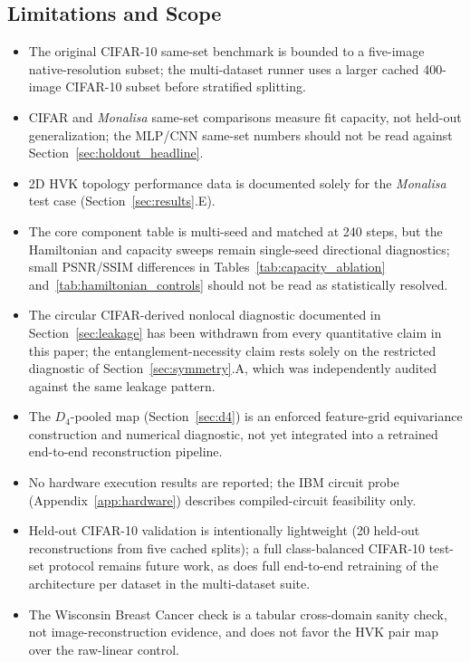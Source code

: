 \documentclass[journal]{IEEEtran}
\begin{document}
\subsection{Limitations and Scope}
\begin{itemize}
    \item The original CIFAR-10 same-set benchmark is bounded to a five-image native-resolution subset; the multi-dataset runner uses a larger cached 400-image CIFAR-10 subset before stratified splitting.
    \item CIFAR and \textit{Monalisa} same-set comparisons measure fit capacity, not held-out generalization; the MLP/CNN same-set numbers should not be read against Section~\ref{sec:holdout_headline}.
    \item 2D HVK topology performance data is documented solely for the \textit{Monalisa} test case (Section~\ref{sec:results}.E).
    \item The core component table is multi-seed and matched at 240 steps, but the Hamiltonian and capacity sweeps remain single-seed directional diagnostics; small PSNR/SSIM differences in Tables~\ref{tab:capacity_ablation} and~\ref{tab:hamiltonian_controls} should not be read as statistically resolved.
    \item The circular CIFAR-derived nonlocal diagnostic documented in Section~\ref{sec:leakage} has been withdrawn from every quantitative claim in this paper; the entanglement-necessity claim rests solely on the restricted diagnostic of Section~\ref{sec:symmetry}.A, which was independently audited against the same leakage pattern.
    \item The $D_4$-pooled map (Section~\ref{sec:d4}) is an enforced feature-grid equivariance construction and numerical diagnostic, not yet integrated into a retrained end-to-end reconstruction pipeline.
    \item No hardware execution results are reported; the IBM circuit probe (Appendix~\ref{app:hardware}) describes compiled-circuit feasibility only.
    \item Held-out CIFAR-10 validation is intentionally lightweight (20 held-out reconstructions from five cached splits); a full class-balanced CIFAR-10 test-set protocol remains future work, as does full end-to-end retraining of the architecture per dataset in the multi-dataset suite.
    \item The Wisconsin Breast Cancer check is a tabular cross-domain sanity check, not image-reconstruction evidence, and does not favor the HVK pair map over the raw-linear control.
\end{itemize}
\end{document}
